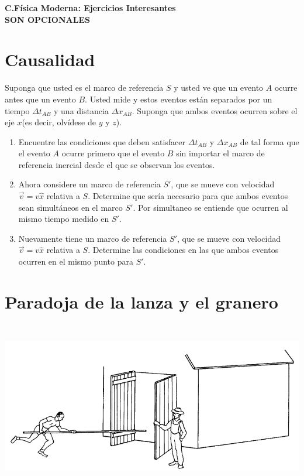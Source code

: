 \documentclass[12pt]{article}
\begin{document}
 
\begin{center}
\Large \textbf{C.Física Moderna: Ejercicios Interesantes}\\
\large \textbf{SON OPCIONALES}\\
\end{center}
 
\section{Causalidad} 
 
Suponga que usted es el marco de referencia $S$ y usted ve que un evento $A$ ocurre antes que un evento $B$. Usted mide y estos eventos están separados por un tiempo $\Delta t_{AB}$ y una distancia $\Delta x_{AB}$. Suponga que ambos eventos ocurren sobre el eje $x$(es decir, olvídese de $y$ y $z$).

\begin{enumerate}
	\item Encuentre las condiciones que deben satisfacer $\Delta t_{AB}$ y $\Delta x_{AB}$ de tal forma que el evento $A$ ocurre primero que el evento $B$ sin importar el marco de referencia inercial desde el que se observan los eventos.
	\item Ahora considere un marco de referencia $S'$, que se mueve con velocidad $\vec{v} = v \hat{x}$ relativa a $S$. Determine que sería necesario para que ambos eventos sean simultáneos en el marco $S'$. Por simultaneo se entiende que ocurren al mismo tiempo medido en $S'$.
	\item Nuevamente tiene un marco de referencia $S'$, que se mueve con velocidad $\vec{v} = v \hat{x}$ relativa a $S$. Determine las condiciones en las que ambos eventos ocurren en el mismo punto para $S'$. 
\end{enumerate}
 

 \section{Paradoja de la lanza y el granero} 
 

 
 \includegraphics[height=7.4cm]{1}
 
\end{document}
